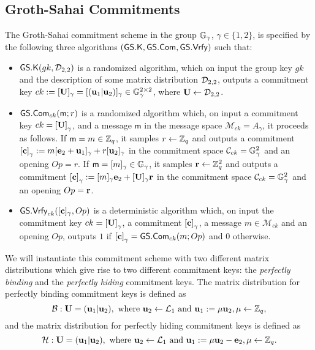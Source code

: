 \subsection{Groth-Sahai Commitments} \label{sec:gs-comms}
 
\begin{definition} The Groth-Sahai commitment scheme in the group $\mathbb{G}_\gamma$, $\gamma\in\{1,2\}$, is  specified by the following three algorithms 
	$(\mathsf{GS}.\mathsf{K},\mathsf{GS}.\mathsf{Com},\mathsf{GS}.\mathsf{Vrfy})$ such that:
	\begin{itemize} 
		\item  $\mathsf{GS}.\mathsf{K}(gk,\mathcal{D}_{2,2})$ is a randomized algorithm, which on input the group key $gk$ and the description of some matrix distribution $\mathcal{D}_{2,2}$, outputs a commitment key $ck:=[\mathbf{{U}}]_\gamma=[(\mathbf{u}_1|\mathbf{u}_2)]_\gamma \in\mathbb{G}_\gamma^{2\times 2}$, where $\mathbf{{U}}\gets\mathcal{D}_{2,2}$.
		\item $\mathsf{GS}.\mathsf{Com}_{ck}(\mathsf{m};r)$ is a randomized algorithm which, on input a commitment key $ck=\left[\mathbf{{U}}\right]_\gamma$, and a message 
		$\mathsf{m}$ in the message space $\mathcal{M}_{ck}=A_\gamma$, it proceeds as follows. If $\mathsf{m}=m\in\mathbb{Z}_q$, it samples $r \gets \mathbb{Z}_q$ and outputs a commitment $\left[\mathbf{c}\right]_\gamma := m[\mathbf{e}_2+\mathbf{u}_1]_\gamma+r[\mathbf{u}_2]_\gamma$ in the commitment space $\mathcal{C}_{ck}=\mathbb{G}_\gamma^2$ and an opening $Op=r$. If $\mathsf{m}=[m]_\gamma\in\mathbb{G}_\gamma$, it samples $\mathbf{r} \gets \mathbb{Z}_q^2$ and outputs a commitment $\left[\mathbf{c}\right]_\gamma := [m]_\gamma\mathbf{e}_2+[\mathbf{{U}}]_\gamma\mathbf{r}$ in the commitment space $\mathcal{C}_{ck}=\mathbb{G}_\gamma^2$ and an opening $Op=\mathbf{r}$.
		\item $\mathsf{GS}.\mathsf{Vrfy}_{ck}([\mathbf{c}]_\gamma,Op)$ is a deterministic algorithm which, on input the commitment key $ck=\left[\mathbf{{U}}\right]_\gamma$, a commitment $\left[\mathbf{c}\right]_\gamma$,  a message 
		$m \in \mathcal{M}_{ck}$ and an opening $Op$, outputs $1$ if $\left[\mathbf{c}\right]_\gamma={\mathsf{GS}}.\mathsf{Com}_{ck}(m;Op)$
		and $0$ otherwise.
	\end{itemize}
\end{definition}

We will instantiate this commitment scheme with two different matrix distributions which give rise to two different commitment keys: the \emph{perfectly binding} and the \emph{perfectly hiding} commitment keys. The matrix distribution for perfectly binding commitment keys is defined as
$$
\mathcal{B}:\mathbf{{U}}=(\mathbf{u}_1|\mathbf{u}_2),\text{ where }\mathbf{u}_2\gets\mathcal{L}_1\text{ and } \mathbf{u}_1 :=\mu\mathbf{u}_2, \mu\gets\mathbb{Z}_q,
$$
and the matrix distribution for perfectly hiding commitment keys is defined as
$$
\mathcal{H}:\mathbf{{U}}=(\mathbf{u}_1|\mathbf{u}_2),\text{ where } \mathbf{u}_2\gets\mathcal{L}_1\text{ and } \mathbf{u}_1 :=\mu\mathbf{u}_2-\mathbf{e}_2, \mu\gets\mathbb{Z}_q.
$$

